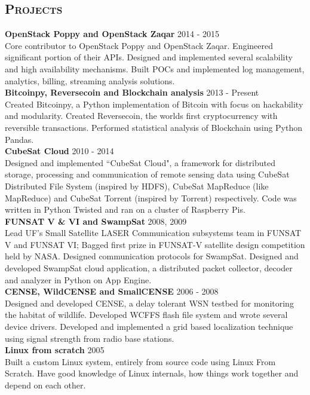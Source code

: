 \begin{resume}
\section{\textsc{Projects}}
\textbf{OpenStack Poppy and OpenStack Zaqar} \hfill 2014 - 2015\\
Core contributor to OpenStack Poppy and OpenStack Zaqar. Engineered significant portion of their APIs. Designed and implemented several scalability and high availability mechanisms. Built POCs and implemented log management, analytics, billing, streaming analysis solutions.\\
\textbf{Bitcoinpy, Reversecoin and Blockchain analysis} \hfill 2013 - Present\\
Created Bitcoinpy, a Python implementation of Bitcoin with focus on hackability and modularity. Created Reversecoin, the worlds first cryptocurrency with reversible transactions. Performed statistical analysis of Blockchain using Python Pandas.\\
\textbf{CubeSat Cloud} \hfill 2010 - 2014 \\
Designed and implemented ``CubeSat Cloud", a framework for distributed storage, processing and communication of remote sensing data using CubeSat Distributed File System (inspired by HDFS), CubeSat MapReduce (like MapReduce) and CubeSat Torrent (inspired by Torrent) respectively. Code was written in Python Twisted and ran on a cluster of Raspberry Pis.\\
\textbf{FUNSAT V \& VI and SwampSat} \hfill 2008, 2009 \\
Lead UF's Small Satellite LASER Communication subsystems team in FUNSAT V and FUNSAT VI; Bagged first prize in FUNSAT-V satellite design competition held by NASA. Designed communication protocols for SwampSat. Designed and developed SwampSat cloud application, a distributed packet collector, decoder and analyzer in Python on App Engine.\\
\textbf{CENSE, WildCENSE and SmallCENSE} \hfill 2006 - 2008\\
Designed and developed CENSE, a delay tolerant WSN testbed for monitoring the habitat of wildlife. Developed WCFFS flash file system and wrote several device drivers. Developed and implemented a grid based localization technique using signal strength from radio base stations.\\
\textbf{Linux from scratch} \hfill 2005 \\
Built a custom Linux system, entirely from source code using Linux From Scratch. Have good knowledge of Linux internals, how things work together and depend on each other.


\end{resume}
